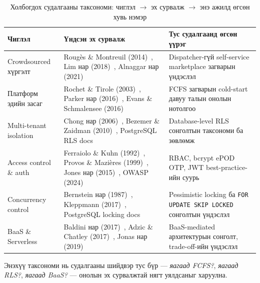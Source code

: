 \begin{table}[H]
\centering
\footnotesize
\renewcommand{\arraystretch}{1.3}
\caption{Холбогдох судалгааны таксономи: чиглэл $\to$ эх сурвалж $\to$ энэ ажилд өгсөн хувь нэмэр}
\label{tab:related_works_taxonomy}
\begin{tabular}{|p{3cm}|p{5.5cm}|p{5.5cm}|}
\hline
\textbf{Чиглэл} & \textbf{Үндсэн эх сурвалж} & \textbf{Тус судалгаанд өгсөн үүрэг} \\ \hline
Crowdsourced хүргэлт & Rougès \& Montreuil (2014)~\cite{rouges2014crowdsourcing}, Lim нар (2018)~\cite{lim2018lastmile}, Alnaggar нар (2021)~\cite{alnaggar2021crowdsourced} & Dispatcher-гүй self-service marketplace загварын үндэслэл \\ \hline
Платформ эдийн засаг & Rochet \& Tirole (2003)~\cite{rochet2003platform}, Parker нар (2016)~\cite{parker2016platform}, Evans \& Schmalensee (2016)~\cite{evans2016matchmakers} & FCFS загварын cold-start давуу талын онолын нотолгоо \\ \hline
Multi-tenant isolation & Chong нар (2006)~\cite{chong2006multitenant}, Bezemer \& Zaidman (2010)~\cite{bezemer2010multitenant}, PostgreSQL RLS docs~\cite{postgresql2024rowsecurity} & Database-level RLS сонголтын таксономи ба зөвлөмж \\ \hline
Access control \& auth & Ferraiolo \& Kuhn (1992)~\cite{ferraiolo1992rbac}, Provos \& Mazi\`eres (1999)~\cite{provos1999bcrypt}, Jones нар (2015)~\cite{jones2015jwt}, OWASP (2024)~\cite{owasp2024authcheatsheet} & RBAC, bcrypt ePOD OTP, JWT best-practice-ийн суурь \\ \hline
Concurrency control & Bernstein нар (1987)~\cite{bernstein1987concurrency}, Kleppmann (2017)~\cite{kleppmann2017ddia}, PostgreSQL locking docs~\cite{postgresql2024locking} & Pessimistic locking ба \texttt{FOR UPDATE SKIP LOCKED} сонголтын үндэслэл \\ \hline
BaaS \& Serverless & Baldini нар (2017)~\cite{baldini2017serverless}, Adzic \& Chatley (2017)~\cite{adzic2017serverless}, Jonas нар (2019)~\cite{jonas2019berkeleyserverless} & BaaS-mediated архитектурын сонголт, trade-off-ийн үндэслэл \\ \hline
\end{tabular}
\end{table}

Энэхүү таксономи нь судалгааны шийдвэр тус бүр — \textit{яагаад FCFS?}, \textit{яагаад RLS?}, \textit{яагаад BaaS?} — онолын эх сурвалжтай нягт уялдсаныг харуулна.

